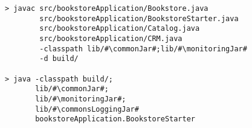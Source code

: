 \begin{lstlisting}[caption=Command to compile and run the instrumented Bookstore under Windows,label=lst:bookstoreStarterWin]
> javac src/bookstoreApplication/Bookstore.java 
        src/bookstoreApplication/BookstoreStarter.java 
        src/bookstoreApplication/Catalog.java 
        src/bookstoreApplication/CRM.java 
        -classpath lib/#\commonJar#;lib/#\monitoringJar#
        -d build/

> java -classpath build/;
       lib/#\commonJar#;
       lib/#\monitoringJar#;
       lib/#\commonsLoggingJar#
       bookstoreApplication.BookstoreStarter 
\end{lstlisting}
